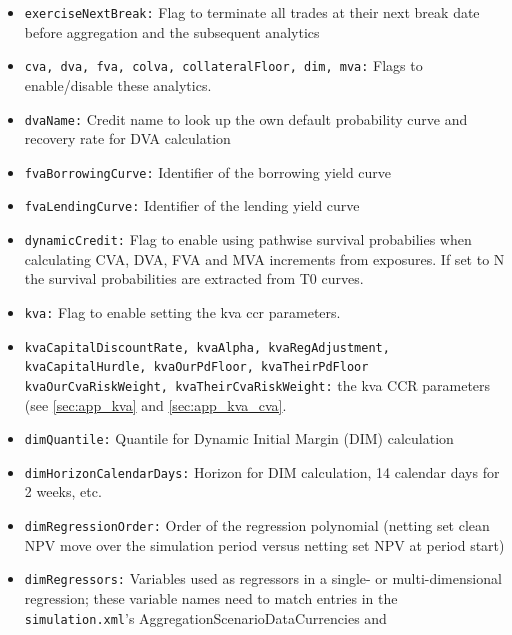 \documentclass[12pt, a4paper]{article}
\begin{document}
{\begin{itemize}
value vanishes while the exposure does not. This parameter acts as a cutoff for the marginal allocation when the
absolute netting set value falls below this limit and switches to equal distribution of the exposure in this case.
\item {\tt exerciseNextBreak:} Flag to terminate all trades at their next break date before aggregation and the
subsequent analytics
\item {\tt cva, dva, fva, colva, collateralFloor, dim, mva:} Flags to enable/disable these analytics. 
\item {\tt dvaName:} Credit name to look up the own default probability curve and recovery rate for DVA calculation
\item {\tt fvaBorrowingCurve:} Identifier of the borrowing yield curve
\item {\tt fvaLendingCurve:} Identifier of the lending yield curve
\item {\tt dynamicCredit:} Flag to enable using pathwise survival probabilies when calculating CVA, DVA, FVA and MVA increments from exposures. If set to N the survival probabilities are extracted from T0 curves.
\item {\tt kva:} Flag to enable setting the kva ccr parameters.
\item {\tt kvaCapitalDiscountRate, kvaAlpha, kvaRegAdjustment, kvaCapitalHurdle, kvaOurPdFloor, kvaTheirPdFloor kvaOurCvaRiskWeight, kvaTheirCvaRiskWeight:} the kva CCR parameters (see \ref{sec:app_kva} and \ref{sec:app_kva_cva}.
\item {\tt dimQuantile:} Quantile for Dynamic Initial Margin (DIM) calculation
\item {\tt dimHorizonCalendarDays:} Horizon for DIM calculation, 14 calendar days for 2 weeks, etc.
\item {\tt dimRegressionOrder:} Order of the regression polynomial (netting set clean NPV move over the simulation
period versus netting set NPV at period start)
\item {\tt dimRegressors:} Variables used as regressors in a single- or multi-dimensional regression; these variable
  names need to match entries in the {\tt simulation.xml}'s AggregationScenarioDataCurrencies and

\end{itemize}}
\end{document}
